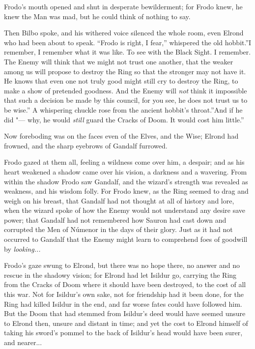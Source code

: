 Frodo's mouth opened and shut in desperate bewilderment; for Frodo knew,
he knew the Man was mad, but he could think of nothing to say.

Then Bilbo spoke, and his withered voice silenced the whole room, even
Elrond who had been about to speak. ``Frodo is right, I fear,''
whispered the old hobbit.''I remember, I remember what it was like. To
see with the Black Sight. I remember. The Enemy will think that we might
not trust one another, that the weaker among us will propose to destroy
the Ring so that the stronger may not have it. He knows that even one
not truly good might still cry to destroy the Ring, to make a show of
pretended goodness. And the Enemy will \emph{not} think it impossible
that such a decision be made by this council, for you see, he does not
trust us to be wise.'' A whispering chuckle rose from the ancient
hobbit's throat.''And if he did "--- why, he would \emph{still} guard the
Cracks of Doom. It would cost him little.''

Now foreboding was on the faces even of the Elves, and the Wise; Elrond
had frowned, and the sharp eyebrows of Gandalf furrowed.

Frodo gazed at them all, feeling a wildness come over him, a despair;
and as his heart weakened a shadow came over his vision, a darkness and
a wavering. From within the shadow Frodo saw Gandalf, and the wizard's
strength was revealed as weakness, and his wisdom folly. For Frodo knew,
as the Ring seemed to drag and weigh on his breast, that Gandalf had not
thought at all of history and lore, when the wizard spoke of how the
Enemy would not understand any desire save power; that Gandalf had not
remembered how Sauron had cast down and corrupted the Men of Númenor in
the days of their glory. Just as it had not occurred to Gandalf that the
Enemy might learn to comprehend foes of goodwill by
\emph{looking...}

Frodo's gaze swung to Elrond, but there was no hope there, no answer and
no rescue in the shadowy vision; for Elrond had let Isildur go, carrying
the Ring from the Cracks of Doom where it should have been destroyed, to
the cost of all this war. Not for Isildur's own sake, not for friendship
had it been done, for the Ring had killed Isildur in the end, and far
worse fates could have followed him. But the Doom that had stemmed from
Isildur's deed would have seemed unsure to Elrond then, unsure and
distant in time; and yet the cost to Elrond himself of taking his
sword's pommel to the back of Isildur's head would have been surer, and
nearer...


